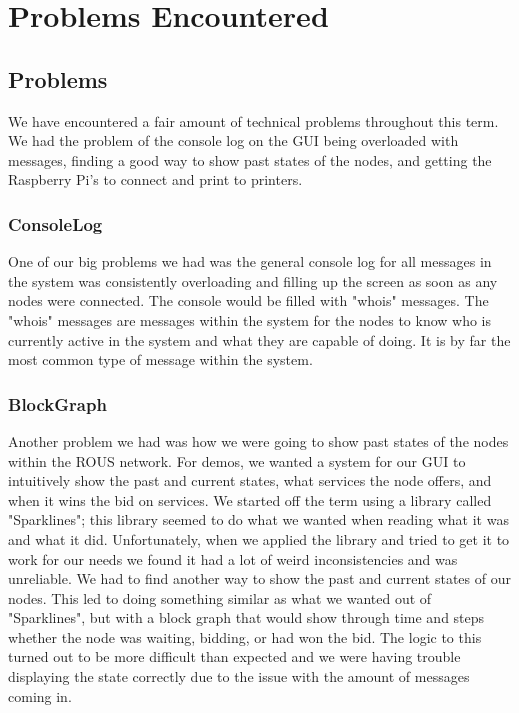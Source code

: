 \documentclass[draftclsnofoot, onecolumn, compsoc, 10pt]{IEEEtran}
\begin{document}
\section{Problems Encountered}
\subsection{Problems}

We have encountered a fair amount of technical problems throughout this term. We had the problem of the console log on the GUI being overloaded with messages, finding a good way to show past states of the nodes, and getting the Raspberry Pi's to connect and print to printers.

\subsubsection{ConsoleLog}
One of our big problems we had was the general console log for all messages in the system was consistently overloading and filling up the screen as soon as any nodes were connected. The console would be filled with "whois" messages. The "whois" messages are messages within the system for the nodes to know who is currently active in the system and what they are capable of doing. It is by far the most common type of message within the system. 

\subsubsection{BlockGraph}
Another problem we had was how we were going to show past states of the nodes within the ROUS network. For demos, we wanted a system for our GUI to intuitively show the past and current states, what services the node offers, and when it wins the bid on services. We started off the term using a library called "Sparklines"; this library seemed to do what we wanted when reading what it was and what it did. Unfortunately, when we applied the library and tried to get it to work for our needs we found it had a lot of weird inconsistencies and was unreliable. We had to find another way to show the past and current states of our nodes. This led to doing something similar as what we wanted out of "Sparklines", but with a block graph that would show through time and steps whether the node was waiting, bidding, or had won the bid. The logic to this turned out to be more difficult than expected and we were having trouble displaying the state correctly due to the issue with the amount of messages coming in. 
\end{document}
